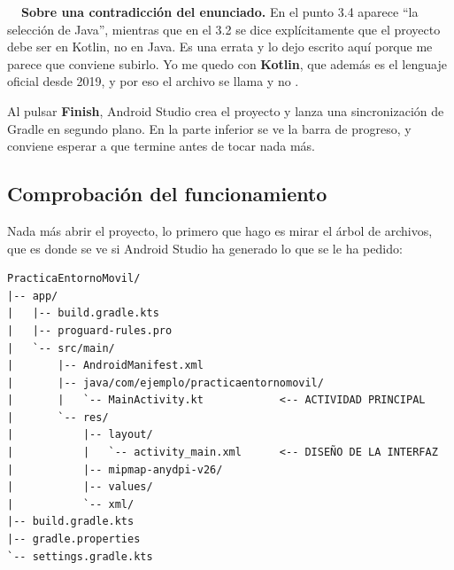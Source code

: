\begin{warnbox}
\textbf{\color{accent!80!black}\faExclamationTriangle\ \ Sobre una contradicción del enunciado.}
En el punto 3.4 aparece \enquote{la selección de Java}, mientras que en el 3.2 se dice explícitamente que el proyecto debe ser en Kotlin, no en Java. Es una errata y lo dejo escrito aquí porque me parece que conviene subirlo. Yo me quedo con \textbf{Kotlin}, que además es el lenguaje oficial desde 2019, y por eso el archivo se llama  y no .
\end{warnbox}


Al pulsar \textbf{Finish}, Android Studio crea el proyecto y lanza una sincronización de Gradle en segundo plano. En la parte inferior se ve la barra de progreso, y conviene esperar a que termine antes de tocar nada más.


\subsection{Comprobación del funcionamiento}

Nada más abrir el proyecto, lo primero que hago es mirar el árbol de archivos, que es donde se ve si Android Studio ha generado lo que se le ha pedido:

\begin{verbatim}
PracticaEntornoMovil/
|-- app/
|   |-- build.gradle.kts
|   |-- proguard-rules.pro
|   `-- src/main/
|       |-- AndroidManifest.xml
|       |-- java/com/ejemplo/practicaentornomovil/
|       |   `-- MainActivity.kt            <-- ACTIVIDAD PRINCIPAL
|       `-- res/
|           |-- layout/
|           |   `-- activity_main.xml      <-- DISEÑO DE LA INTERFAZ
|           |-- mipmap-anydpi-v26/
|           |-- values/
|           `-- xml/
|-- build.gradle.kts
|-- gradle.properties
`-- settings.gradle.kts
\end{verbatim}

